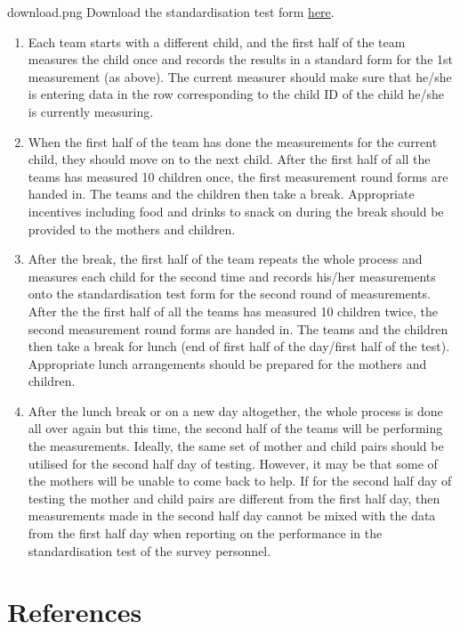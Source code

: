 \documentclass[
  12pt,
]{book}
\newenvironment{rmddownload}
  {\begin{tcolorbox}[width=\textwidth, 
                     colback = {white}, 
                     title = {\textbf{Download}}, 
                     colbacktitle = lightgray,
                     coltitle = black]
  \begin{includegraphics}[scale = 1]{download.png}}
  {\end{includegraphics}
  \end{tcolorbox}}
\begin{document}
\begin{rmddownload}
Download the standardisation test form \href{pdf/standardForm.pdf}{here}.
\end{rmddownload}

\begin{enumerate}
\def\labelenumi{\arabic{enumi}.}
\setcounter{enumi}{1}
\item
  Each team starts with a different child, and the first half of the team measures the child once and records the results in a standard form for the 1st measurement (as above). The current measurer should make sure that he/she is entering data in the row corresponding to the child ID of the child he/she is currently measuring.
\item
  When the first half of the team has done the measurements for the current child, they should move on to the next child. After the first half of all the teams has measured 10 children once, the first measurement round forms are handed in. The teams and the children then take a break. Appropriate incentives including food and drinks to snack on during the break should be provided to the mothers and children.
\item
  After the break, the first half of the team repeats the whole process and measures each child for the second time and records his/her measurements onto the standardisation test form for the second round of measurements. After the the first half of all the teams has measured 10 children twice, the second measurement round forms are handed in. The teams and the children then take a break for lunch (end of first half of the day/first half of the test). Appropriate lunch arrangements should be prepared for the mothers and children.
\item
  After the lunch break or on a new day altogether, the whole process is done all over again but this time, the second half of the teams will be performing the measurements. Ideally, the same set of mother and child pairs should be utilised for the second half day of testing. However, it may be that some of the mothers will be unable to come back to help. If for the second half day of testing the mother and child pairs are different from the first half day, then measurements made in the second half day cannot be mixed with the data from the first half day when reporting on the performance in the standardisation test of the survey personnel.
\end{enumerate}

\hypertarget{references}{%
\chapter*{References}\label{references}}

  
\end{document}
